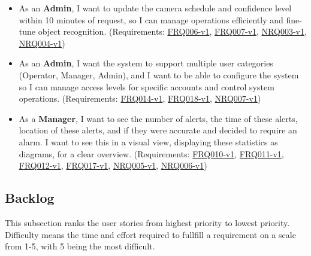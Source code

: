 \documentclass{article}
\begin{document}
\begin{itemize}
    \item As an \textbf{Admin}, I want to update the camera schedule and confidence level within 10 minutes of request, so I can manage operations efficiently and fine-tune object recognition. (Requirements: \hyperlink{FRQ006}{FRQ006-v1}, \hyperlink{FRQ007}{FRQ007-v1}, \hyperlink{NRQ003}{NRQ003-v1}, \hyperlink{NRQ004}{NRQ004-v1})

    \item As an \textbf{Admin}, I want the system to support multiple user categories (Operator, Manager, Admin), and I want to be able to configure the system so I can manage access levels for specific accounts and control system operations. (Requirements: \hyperlink{FRQ014}{FRQ014-v1}, \hyperlink{FRQ018}{FRQ018-v1}, \hyperlink{NRQ007}{NRQ007-v1})

    \item As a \textbf{Manager}, I want to see the number of alerts, the time of these alerts, location of these alerts, and if they were accurate and decided to require an alarm. I want to see this in a visual view, displaying these statistics as diagrams, for a clear overview. (Requirements: \hyperlink{FRQ010}{FRQ010-v1}, \hyperlink{FRQ011}{FRQ011-v1}, \hyperlink{FRQ012}{FRQ012-v1}, \hyperlink{FRQ017}{FRQ017-v1}, \hyperlink{NRQ005}{NRQ005-v1}, \hyperlink{NRQ006}{NRQ006-v1})
    
\end{itemize}

\subsection{Backlog}

This subsection ranks the user stories from highest priority to lowest priority. Difficulty means the time and effort required to fullfill a requirement on a scale from 1-5, with 5 being the most difficult.\\
\end{document}
